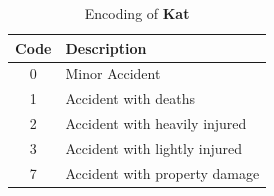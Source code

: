 \begin{table}[!ht]
	\centering
	\small
	\begin{tabular}{c|l} 
		\toprule
		Code & Description \\ 
		\midrule
 		0 	& Minor Accident  \\
 		1 	& Accident with deaths  \\ 
 		2 	& Accident with heavily injured  \\
 		3 	& Accident with lightly injured  \\
		7 	& Accident with property damage  \\
		\bottomrule
	\end{tabular}
	\caption{Encoding of \textbf{Kat}}
	\label{table:analysis_encoding_Kat}
	\vspace{-8mm}
\end{table}

